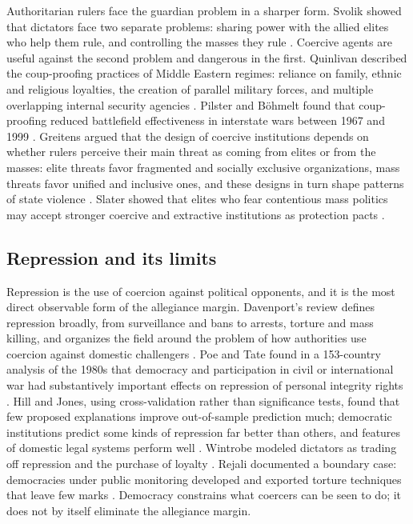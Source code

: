 \documentclass[11pt,letterpaper]{article}
\theoremstyle{definition}
\theoremstyle{remark}
\begin{document}
Authoritarian rulers face the guardian problem in a sharper form. Svolik showed that dictators face two separate problems: sharing power with the allied elites who help them rule, and controlling the masses they rule \citep{svolik2012}. Coercive agents are useful against the second problem and dangerous in the first. Quinlivan described the coup-proofing practices of Middle Eastern regimes: reliance on family, ethnic and religious loyalties, the creation of parallel military forces, and multiple overlapping internal security agencies \citep{quinlivan1999}. Pilster and B\"ohmelt found that coup-proofing reduced battlefield effectiveness in interstate wars between 1967 and 1999 \citep{pilster2011}. Greitens argued that the design of coercive institutions depends on whether rulers perceive their main threat as coming from elites or from the masses: elite threats favor fragmented and socially exclusive organizations, mass threats favor unified and inclusive ones, and these designs in turn shape patterns of state violence \citep{greitens2016}. Slater showed that elites who fear contentious mass politics may accept stronger coercive and extractive institutions as protection pacts \citep{slater2010}.

\subsection{Repression and its limits}

Repression is the use of coercion against political opponents, and it is the most direct observable form of the allegiance margin. Davenport's review defines repression broadly, from surveillance and bans to arrests, torture and mass killing, and organizes the field around the problem of how authorities use coercion against domestic challengers \citep{davenport2007}. Poe and Tate found in a 153-country analysis of the 1980s that democracy and participation in civil or international war had substantively important effects on repression of personal integrity rights \citep{poe1994}. Hill and Jones, using cross-validation rather than significance tests, found that few proposed explanations improve out-of-sample prediction much; democratic institutions predict some kinds of repression far better than others, and features of domestic legal systems perform well \citep{hill2014}. Wintrobe modeled dictators as trading off repression and the purchase of loyalty \citep{wintrobe1998}. Rejali documented a boundary case: democracies under public monitoring developed and exported torture techniques that leave few marks \citep{rejali2007}. Democracy constrains what coercers can be seen to do; it does not by itself eliminate the allegiance margin.
\end{document}
